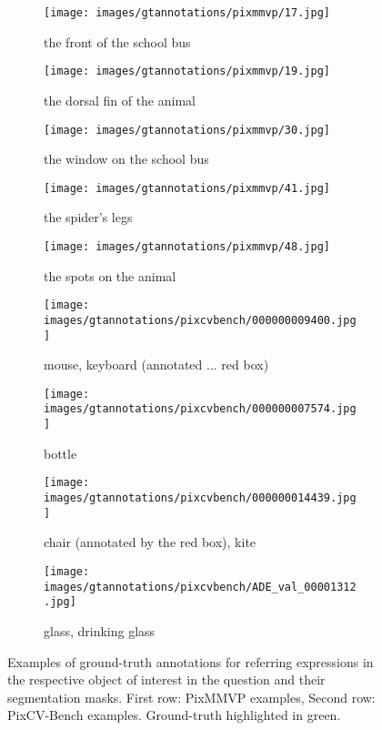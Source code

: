 
\begin{figure*}[t]
\centering
\begin{subfigure}{0.19\textwidth}
\texttt{[image: images/gtannotations/pixmmvp/17.jpg]}
\captionsetup{labelformat=empty}
\caption{\tiny{the front of the school bus}}
\end{subfigure}%
\begin{subfigure}{0.19\textwidth}
\texttt{[image: images/gtannotations/pixmmvp/19.jpg]}
\captionsetup{labelformat=empty}
\caption{\tiny{the dorsal fin of the animal}}
\end{subfigure}%
\begin{subfigure}{0.19\textwidth}
\texttt{[image: images/gtannotations/pixmmvp/30.jpg]}
\captionsetup{labelformat=empty}
\caption{\tiny{the window on the school bus}}
\end{subfigure}%
\begin{subfigure}{0.19\textwidth}
\texttt{[image: images/gtannotations/pixmmvp/41.jpg]}
\captionsetup{labelformat=empty}
\caption{\tiny{the spider's legs}}
\end{subfigure}%
\begin{subfigure}{0.19\textwidth}
\texttt{[image: images/gtannotations/pixmmvp/48.jpg]}
\captionsetup{labelformat=empty}
\caption{\tiny{the spots on the animal}}
\end{subfigure}

\begin{subfigure}{0.19\textwidth}
\texttt{[image: images/gtannotations/pixcvbench/000000009400.jpg]}
\captionsetup{labelformat=empty}
\caption{\tiny{mouse, keyboard (annotated ... red box)}}
\end{subfigure}\hspace{1em}%
\begin{subfigure}{0.19\textwidth}
\texttt{[image: images/gtannotations/pixcvbench/000000007574.jpg]}
\captionsetup{labelformat=empty}
\caption{\tiny{bottle}}
\end{subfigure}\hspace{1em}%
\begin{subfigure}{0.2255\textwidth}
\texttt{[image: images/gtannotations/pixcvbench/000000014439.jpg]}
\captionsetup{labelformat=empty}
\caption{\tiny{chair (annotated by the red box), kite}}
\end{subfigure}\hspace{1em}%
\begin{subfigure}{0.21\textwidth}
\texttt{[image: images/gtannotations/pixcvbench/ADE\_val\_00001312.jpg]}
\captionsetup{labelformat=empty}
\caption{\tiny{glass, drinking glass}}
\end{subfigure}
\caption{Examples of ground-truth annotations for referring expressions in the respective object of interest in the question and their segmentation masks. First row: PixMMVP examples, Second row: PixCV-Bench examples. Ground-truth highlighted in green.}
\label{fig:gt}
\end{figure*}

